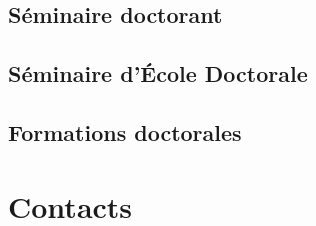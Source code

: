 \documentclass[a5paper]{article}
\begin{document}
\subsection{Séminaire doctorant}
\label{sec:seminaire-doctorant}

\subsection{Séminaire d'École Doctorale}
\label{sec:semin-decole-doct}

\subsection{Formations doctorales}
\label{sec:form-doct}



\appendix

\section{Contacts}
\label{sec:contacts}
\end{document}
